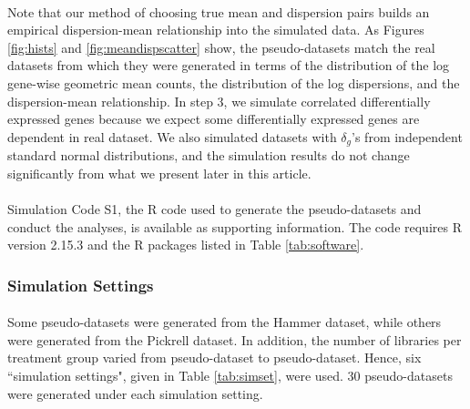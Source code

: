 \documentclass[10pt]{article}
\begin{document}
\paragraph{} \indent Note that our method of choosing true mean and dispersion pairs builds an empirical dispersion-mean relationship into the simulated data. As Figures \ref{fig:hists} and \ref{fig:meandispscatter} show, the pseudo-datasets match the real datasets from which they were generated in terms of the distribution of the log gene-wise geometric mean counts, the distribution of the log dispersions, and the dispersion-mean relationship. In step 3, we simulate correlated differentially expressed %
genes because we expect some differentially expressed %
genes are dependent in real dataset. We also simulated datasets with $\delta_g$'s from independent standard normal distributions, and the simulation results do not change significantly from what we present later in this article.

\paragraph{} \indent Simulation Code S1, the R code used to generate the pseudo-datasets and conduct the analyses, is available as supporting information. The code requires R version 2.15.3 and the R packages listed in Table \ref{tab:software}.


\subsubsection*{Simulation Settings}

\paragraph{} \indent Some pseudo-datasets were generated from the Hammer dataset, while others were generated from the Pickrell dataset. In addition, the number of libraries per treatment group varied from pseudo-dataset to pseudo-dataset. Hence, six ``simulation settings", given in Table \ref{tab:simset}, were used. 30 pseudo-datasets were generated under each simulation setting.
\end{document}
